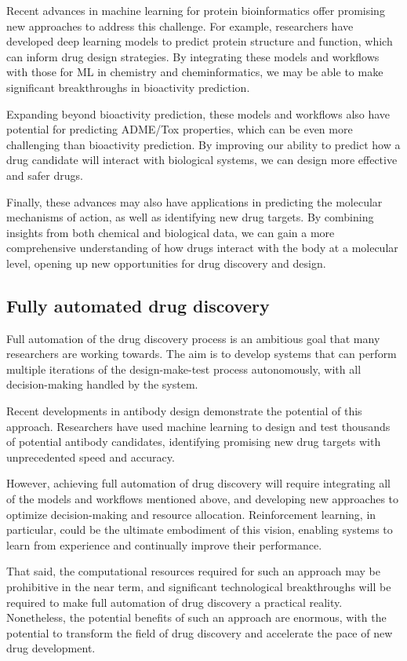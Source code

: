 Recent advances in machine learning for protein bioinformatics offer promising new approaches to address this challenge. For example, researchers have developed deep learning models to predict protein structure and function, which can inform drug design strategies. By integrating these models and workflows with those for ML in chemistry and cheminformatics, we may be able to make significant breakthroughs in bioactivity prediction.

Expanding beyond bioactivity prediction, these models and workflows also have potential for predicting ADME/Tox properties, which can be even more challenging than bioactivity prediction. By improving our ability to predict how a drug candidate will interact with biological systems, we can design more effective and safer drugs.

Finally, these advances may also have applications in predicting the molecular mechanisms of action, as well as identifying new drug targets. By combining insights from both chemical and biological data, we can gain a more comprehensive understanding of how drugs interact with the body at a molecular level, opening up new opportunities for drug discovery and design.

\subsection{Fully automated drug discovery}
Full automation of the drug discovery process is an ambitious goal that many researchers are working towards. The aim is to develop systems that can perform multiple iterations of the design-make-test process autonomously, with all decision-making handled by the system.

Recent developments in antibody design demonstrate the potential of this approach. Researchers have used machine learning to design and test thousands of potential antibody candidates, identifying promising new drug targets with unprecedented speed and accuracy.

However, achieving full automation of drug discovery will require integrating all of the models and workflows mentioned above, and developing new approaches to optimize decision-making and resource allocation. Reinforcement learning, in particular, could be the ultimate embodiment of this vision, enabling systems to learn from experience and continually improve their performance.

That said, the computational resources required for such an approach may be prohibitive in the near term, and significant technological breakthroughs will be required to make full automation of drug discovery a practical reality. Nonetheless, the potential benefits of such an approach are enormous, with the potential to transform the field of drug discovery and accelerate the pace of new drug development.
